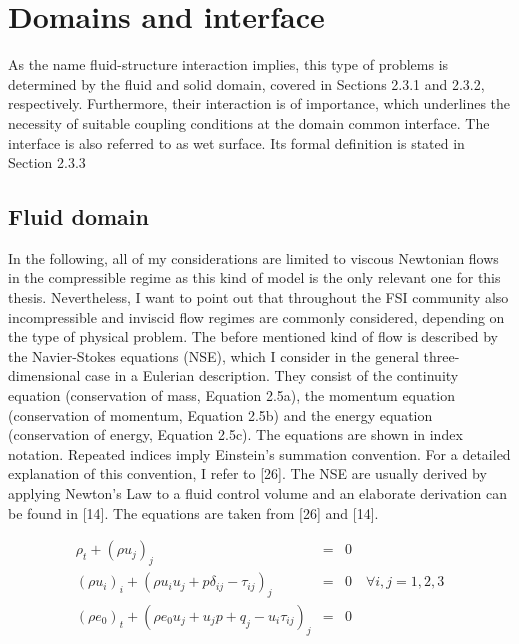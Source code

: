 \section{Domains and interface}
\label{sec:models}

As the name fluid-structure interaction implies, this type of problems is determined by the fluid and solid
domain, covered in Sections 2.3.1 and 2.3.2, respectively. Furthermore, their interaction is of importance,
which underlines the necessity of suitable coupling conditions at the domain common interface. The
interface is also referred to as wet surface. Its formal definition is stated in Section 2.3.3

\subsection{Fluid domain}

In the following, all of my considerations are limited to viscous Newtonian flows in the compressible
regime as this kind of model is the only relevant one for this thesis. Nevertheless, I want to point out that
throughout the FSI community also incompressible and inviscid flow regimes are commonly considered,
depending on the type of physical problem.
The before mentioned kind of flow is described by the Navier-Stokes equations (NSE), which I consider
in the general three-dimensional case in a Eulerian description. They consist of the continuity equation
(conservation of mass, Equation 2.5a), the momentum equation (conservation of momentum, Equation
2.5b) and the energy equation (conservation of energy, Equation 2.5c). The equations are shown in index
notation. Repeated indices imply Einstein’s summation convention. For a detailed explanation of this
convention, I refer to [26]. The NSE are usually derived by applying Newton’s Law to a fluid control
volume and an elaborate derivation can be found in [14]. The equations are taken from [26] and [14].

\begin{eqnarray}
	\rho_t + \left(\rho u_j\right)_j &=&  0 \\
	\left(\rho u_i\right)_i + \left(\rho u_i u_j +p\delta_{ij} -\tau_{ij}\right)_j &=& 0 \quad \forall i,j = 1,2,3 \\
	\left(\rho e_0\right)_t + \left(\rho e_0 u_j +u_jp + q_j -u_i \tau_{ij}\right)_j &=& 0
\end{eqnarray}



